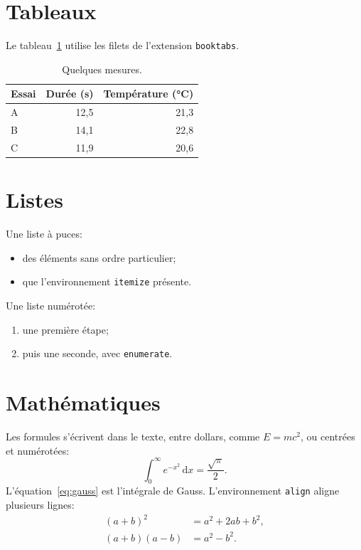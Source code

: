 \documentclass{article}
\begin{document}
\section{Tableaux}

Le tableau~\ref{tab:mesures} utilise les filets de l'extension
\texttt{booktabs}.

\begin{table}[htbp]
  \centering
  \caption{Quelques mesures.}
  \label{tab:mesures}
  \begin{tabular}{lrr}
    \toprule
    Essai & Durée (s) & Température (°C) \\
    \midrule
    A & 12,5 & 21,3 \\
    B & 14,1 & 22,8 \\
    C & 11,9 & 20,6 \\
    \bottomrule
  \end{tabular}
\end{table}

\section{Listes}

Une liste à puces:
\begin{itemize}
  \item des éléments sans ordre particulier;
  \item que l'environnement \texttt{itemize} présente.
\end{itemize}
Une liste numérotée:
\begin{enumerate}
  \item une première étape;
  \item puis une seconde, avec \texttt{enumerate}.
\end{enumerate}

\section{Mathématiques}

Les formules s'écrivent dans le texte, entre dollars, comme $E = mc^2$, ou
centrées et numérotées:
\begin{equation}
  \int_0^{\infty} e^{-x^2} \, \mathrm{d}x = \frac{\sqrt{\pi}}{2}.
  \label{eq:gauss}
\end{equation}
L'équation~\eqref{eq:gauss} est l'intégrale de Gauss. L'environnement
\texttt{align} aligne plusieurs lignes:
\begin{align}
  (a + b)^2 &= a^2 + 2ab + b^2, \\
  (a + b)(a - b) &= a^2 - b^2.
\end{align}
\end{document}
